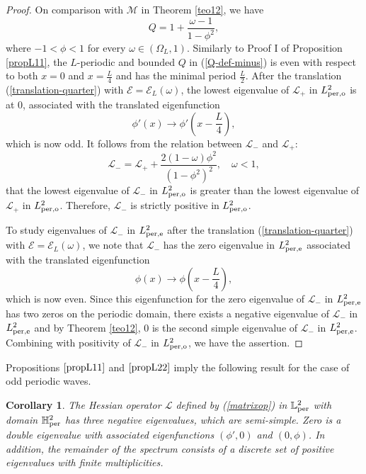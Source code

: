 \documentclass[12pt,reqno]{amsart}
\numberwithin{equation}{section}
\numberwithin{figure}{section}
\newtheorem{corollary}[theorem]{Corollary}
\begin{document}
\begin{proof}
On comparison with $\mathcal{M}$ in Theorem \ref{teo12}, we have 
	\begin{equation}
	\label{Q-def-minus}
	Q = 1 + \frac{\omega-1}{1-\phi^2},
	\end{equation}
	where $-1 < \phi < 1$ for every $\omega \in (\Omega_L,1)$. 
	Similarly to Proof I of Proposition \ref{propL11}, the $L$-periodic and bounded 
	$Q$ in (\ref{Q-def-minus}) is even with respect to both $x = 0$ and $x = \frac{L}{4}$ and has the minimal period $\frac{L}{2}$. After the translation (\ref{translation-quarter}) with $\mathcal{E}= \mathcal{E}_L(\omega)$, 
the lowest eigenvalue of $\mathcal{L}_+$ in $L^2_{\rm per,o}$ is at $0$, associated with the translated eigenfunction 
\begin{equation*}
\phi'(x) \to \phi'\left(x - \frac{L}{4} \right),
\end{equation*}	
which is now odd. It follows from the relation between $\mathcal{L}_-$ and $\mathcal{L}_+$:
$$
\mathcal{L}_- = \mathcal{L}_+ + \frac{2 (1-\omega) \phi^2}{(1-\phi^2)^2}, \quad \omega < 1, 
$$
that the lowest eigenvalue of $\mathcal{L}_-$ in $L^2_{\rm per,o}$ is greater than 
the lowest eigenvalue of $\mathcal{L}_+$ in $L^2_{\rm per,o}$. Therefore, $\mathcal{L}_-$ is strictly positive in $L^2_{\rm per,o}$. 

To study eigenvalues of $\mathcal{L}_-$ in $L^2_{\rm per,e}$ after the translation (\ref{translation-quarter}) with $\mathcal{E}= \mathcal{E}_L(\omega)$, we note that 
$\mathcal{L}_-$ has the zero eigenvalue in $L^2_{\rm per,e}$ 
associated with the translated eigenfunction 
\begin{equation*}
\phi(x) \to \phi\left(x - \frac{L}{4} \right),
\end{equation*}	
which is now even. Since this eigenfunction for the zero eigenvalue of $\mathcal{L}_-$ in $L^2_{\rm per,e}$ has two zeros on the periodic domain, 
there exists a negative eigenvalue of $\mathcal{L}_-$ in $L^2_{\rm per,e}$ 
and by Theorem \ref{teo12}, $0$ is the second simple eigenvalue of $\mathcal{L}_-$ in $L^2_{\rm per,e}$. Combining with positivity of $\mathcal{L}_-$ in $L^2_{\rm per,o}$, we have the assertion.
\end{proof}

Propositions $\ref{propL11}$ and $\ref{propL22}$ imply the following result for the case of odd periodic waves.

\begin{corollary}
	\label{propLL} 
	The Hessian operator $\mathcal{L}$ defined by (\ref{matrixop}) in  $\mathbb{L}^2_{\rm per}$ with domain $\mathbb{H}^2_{\rm per}$ has three negative eigenvalues, which are semi-simple. Zero is a double eigenvalue with associated eigenfunctions $(\phi',0)$ and $(0,\phi)$.  In addition, the remainder of the spectrum consists of a discrete set of positive eigenvalues with finite multiplicities.
\end{corollary}
\end{document}
